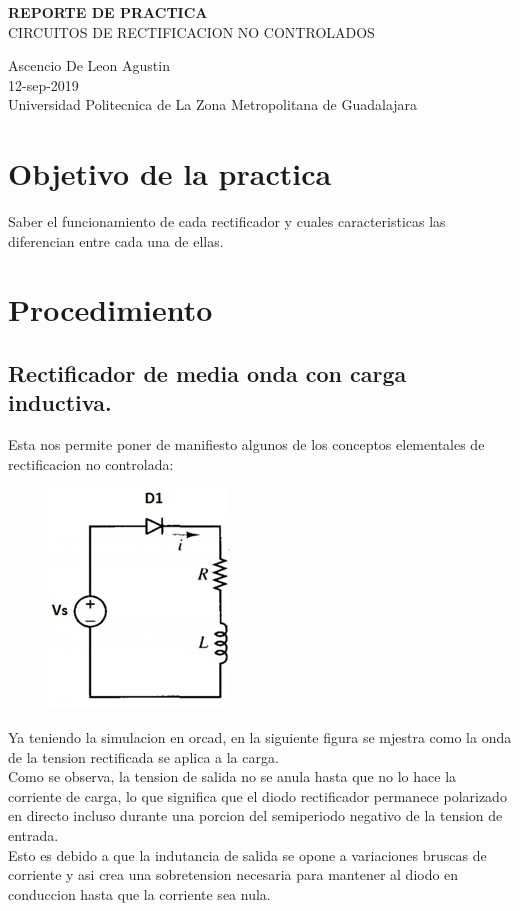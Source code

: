 \documentclass[11pt,a4paper]{article}
\begin{document}
\begin{center}
\textbf{REPORTE DE PRACTICA}\\
CIRCUITOS DE RECTIFICACION NO CONTROLADOS
\end{center}

\begin{center}
Ascencio De Leon Agustin\\
12-sep-2019\\
Universidad Politecnica de La Zona Metropolitana de Guadalajara
\end{center}

\section{Objetivo de la practica}
Saber el funcionamiento de cada rectificador y cuales caracteristicas las diferencian entre cada una de ellas.

\section{Procedimiento}
\subsection{Rectificador de media onda con carga inductiva.}
Esta nos permite poner de manifiesto algunos de los conceptos elementales de rectificacion no controlada:

\begin{figure}[h]
\centering
\includegraphics[scale=.4]{1.png} 
\end{figure}

Ya teniendo la simulacion en orcad, en la siguiente figura se mjestra como la onda de la tension rectificada se aplica a la carga.\\
Como se observa, la tension de salida no se anula hasta que no lo hace la corriente de carga, lo que significa que el diodo rectificador permanece polarizado en directo incluso durante una porcion del semiperiodo negativo de la tension de entrada.\\
\newpage Esto es debido a que la indutancia de salida se opone a variaciones bruscas de corriente y asi crea una sobretension necesaria para mantener al diodo en conduccion hasta que la corriente sea nula.
\end{document}
